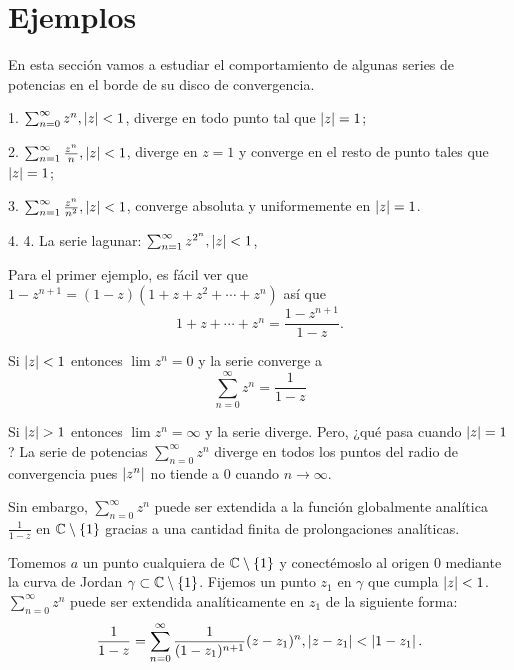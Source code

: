 \chapter{Ejemplos}


En esta sección vamos a estudiar el comportamiento de algunas series de potencias en el borde de su disco de convergencia.

1. $\sum_{n=0}^{\infty} z^n, \left\lvert z\right\rvert < 1$, diverge en todo punto tal que $\left\lvert z\right\rvert = 1$;

2. $\sum_{n=1}^{\infty} \frac{z^n}{n}, \left\lvert z\right\rvert < 1$, diverge en $z = 1$  y converge en el resto de punto tales que $\left\lvert z\right\rvert = 1$;

3. $\sum_{n=1}^{\infty} \frac{z^n}{n^2}, \left\lvert z\right\rvert < 1$, converge absoluta y uniformemente en $\left\lvert z\right\rvert = 1$.

4. 4. La serie lagunar: $\sum_{n=1}^{\infty}  z^{2^n}, \left\lvert z\right\rvert < 1$,  \\ \par


Para el primer ejemplo, es fácil ver que $1 - z^{n+1} = (1 - z) (1+ z + z^2 + \cdots + z^n)$ así que
\begin{equation}
    1 + z + \cdots + z^n = \frac{1 - z^{n+1}}{1-z}.
\end{equation}

Si $\left\lvert z\right\rvert < 1$ entonces $\lim z^n = 0$ y la serie converge a
\begin{equation*}
    \sum_{n=0}^{\infty} z^n = \frac{1}{1 - z}
\end{equation*}

Si $\left\lvert z\right\rvert > 1$ entonces $\lim z^n = \infty$ y la serie diverge. Pero, ¿qué pasa cuando $\left\lvert z\right\rvert = 1$? La serie de potencias $\sum_{n=0}^{\infty} z^n$ diverge en todos los puntos del radio de convergencia pues $\left\lvert z^n\right\rvert$ no tiende a 0 cuando $n \rightarrow \infty$.

Sin embargo, $\sum_{n=0}^{\infty} z^n$ puede ser extendida a la función globalmente analítica $\frac{1}{1-z}$ en $\mathbb{C} \setminus \{1\}$ gracias a una cantidad finita de prolongaciones analíticas.

Tomemos $a$ un punto cualquiera de $\mathbb{C} \setminus \{1\}$ y conectémoslo al origen $0$ mediante la curva de Jordan $\gamma \subset \mathbb{C} \setminus \{1\}$. Fijemos un punto $z_1$ en $\gamma$ que cumpla $\left\lvert z\right\rvert < 1$. $\sum_{n=0}^{\infty} z^n$ puede ser extendida analíticamente en $z_1$ de la siguiente forma:
\begin{equation*}
    \frac{1}{1-z} = \sum_{n=0}^{\infty} \frac{1}{(1 - z_1)^{n+1}} (z - z_1)^n , \left\lvert z - z_1\right\rvert < \left\lvert1 - z_1\right\rvert.
\end{equation*}

